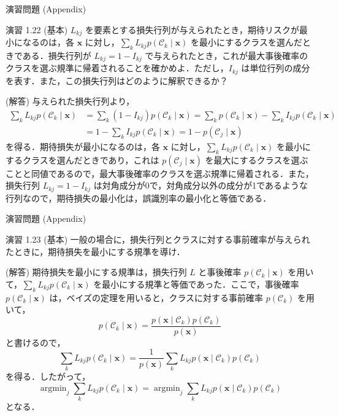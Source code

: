 \documentclass[uplatex,11pt,dvipdfmx,aspectratio=169,unicode,t]{beamer}
\numberwithin{equation}{section}
\newcommand{\CC}{\mathcal{C}}
\newcommand{\bs}[1]{\boldsymbol{#1}}
\newcommand{\1}{\bs{1}}
\newcommand{\0}{\bs{0}}
\DeclareMathOperator*{\argmin}{argmin}
\begin{document}
\begin{frame}{演習問題 (Appendix)}
    \fontsize{7pt}{0cm}\selectfont
    \begin{block}{演習 1.22 (基本) }
        $L_{kj}$ を要素とする損失行列が与えられたとき，期待リスクが最小になるのは，各 $\bs{x}$ に対し，$\sum_{k} L_{kj} p(\CC_{k} \mid \bs{x})$ を最小にするクラスを選んだときである．損失行列が $L_{kj} = 1 - I_{kj}$ で与えられたとき，これが最大事後確率のクラスを選ぶ規準に帰着されることを確かめよ．ただし，$I_{kj}$ は単位行列の成分を表す．また，この損失行列はどのように解釈できるか？
    \end{block}
    (解答) 与えられた損失行列より，
    \begin{align}
        \sum_{k} L_{kj} p(\CC_{k} \mid \bs{x}) &= \sum_{k} (1 - I_{kj}) p(\CC_{k} \mid \bs{x}) = \sum_{k} p(\CC_{k} \mid \bs{x}) - \sum_{k} I_{kj} p(\CC_{k} \mid \bs{x}) \\
        &= 1 - \sum_{k} I_{kj} p(\CC_{k} \mid \bs{x}) = 1 - p(\CC_{j} \mid \bs{x})
    \end{align}
    を得る．期待損失が最小になるのは，各 $\bs{x}$ に対し，$\sum_{k} L_{kj} p(\CC_{k} \mid \bs{x})$ を最小にするクラスを選んだときであり，これは $p(\CC_{j} \mid \bs{x})$ を最大にするクラスを選ぶことと同値であるので，最大事後確率のクラスを選ぶ規準に帰着される．また，損失行列 $L_{kj} = 1 - I_{kj}$ は対角成分が0で，対角成分以外の成分が1であるような行列なので，期待損失の最小化は，誤識別率の最小化と等価である．
\end{frame}

\begin{frame}{演習問題 (Appendix)}
    \fontsize{7pt}{0cm}\selectfont
    \begin{block}{演習 1.23 (基本)}
        一般の場合に，損失行列とクラスに対する事前確率が与えられたときに，期待損失を最小にする規準を導け．
    \end{block}
    (解答) 期待損失を最小にする規準は，損失行列 $L$ と事後確率 $p(\CC_{k} \mid \bs{x})$ を用いて，$\sum_{k} L_{kj} p(\CC_{k} \mid \bs{x})$ を最小にする規準と等価であった．ここで，事後確率 $p(\CC_{k} \mid \bs{x})$ は，ベイズの定理を用いると，クラスに対する事前確率 $p(\CC_{k})$ を用いて，
    \begin{equation}
        p(\CC_{k} \mid \bs{x}) = \frac{p(\bs{x} \mid \CC_{k}) p(\CC_{k})}{p(\bs{x})}
    \end{equation}
    と書けるので，
    \begin{equation}
        \sum_{k} L_{kj} p(\CC_{k} \mid \bs{x}) = \frac{1}{p(\bs{x})} \sum_{k} L_{kj} p(\bs{x} \mid \CC_{k}) p(\CC_{k})
    \end{equation}
    を得る．したがって，
    \begin{equation}
        \argmin_{j} \sum_{k} L_{kj} p(\CC_{k} \mid \bs{x}) = \argmin_{j} \sum_{k} L_{kj} p(\bs{x} \mid \CC_{k}) p(\CC_{k})
    \end{equation}
    となる．
\end{frame}
\end{document}
